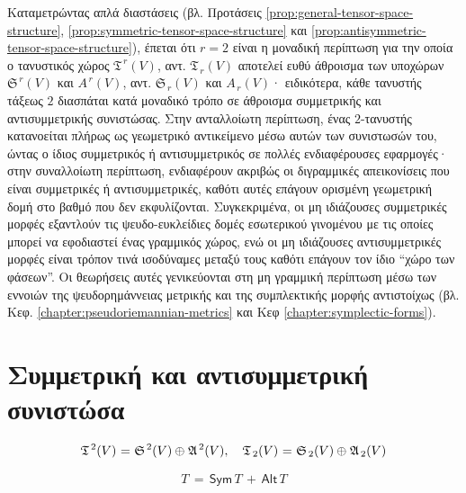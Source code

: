 \documentclass[11pt,a4paper,twoside,openright]{book}
\begin{document}
Καταμετρώντας απλά διαστάσεις (βλ. Προτάσεις \ref{prop:general-tensor-space-structure}, \ref{prop:symmetric-tensor-space-structure} και \ref{prop:antisymmetric-tensor-space-structure}), έπεται ότι $r=2$
είναι η μοναδική περίπτωση για την οποία ο τανυστικός χώρος
$\mathfrak{T}^{\,r}(V)$, αντ. $\mathfrak{T}_{\,r}(V)$ αποτελεί ευθύ άθροισμα των υποχώρων
$\mathfrak{S}^{\,r}(V)$ και $\mathfrak{Α}^{\,r}(V)$, αντ. $\mathfrak{S}_{\,r}(V)$ και $\mathfrak{Α}_{\,r}(V)$· ειδικότερα, κάθε τανυστής τάξεως $2$ διασπάται κατά μοναδικό τρόπο σε άθροισμα συμμετρικής και αντισυμμετρικής συνιστώσας. Στην ανταλλοίωτη περίπτωση, ένας $2$-τανυστής κατανοείται πλήρως ως γεωμετρικό αντικείμενο μέσω αυτών των συνιστωσών του, ώντας ο ίδιος συμμετρικός ή αντισυμμετρικός σε πολλές ενδιαφέρουσες εφαρμογές· στην συναλλοίωτη περίπτωση, ενδιαφέρουν ακριβώς οι διγραμμικές απεικονίσεις που είναι συμμετρικές ή αντισυμμετρικές, καθότι αυτές επάγουν ορισμένη γεωμετρική δομή στο βαθμό που δεν εκφυλίζονται. Συγκεκριμένα, οι μη ιδιάζουσες συμμετρικές μορφές εξαντλούν τις ψευδο-ευκλείδιες δομές εσωτερικού γινομένου με τις οποίες μπορεί να εφοδιαστεί ένας γραμμικός χώρος, ενώ οι μη ιδιάζουσες αντισυμμετρικές μορφές είναι τρόπον τινά ισοδύναμες μεταξύ τους
καθότι επάγουν τον ίδιο ``χώρο των φάσεων''.
Οι θεωρήσεις αυτές γενικεύονται στη μη γραμμική περίπτωση μέσω των εννοιών της ψευδορημάννειας μετρικής και της συμπλεκτικής μορφής
αντιστοίχως
(βλ. Κεφ. \ref{chapter:pseudoriemannian-metrics} και Κεφ \ref{chapter:symplectic-forms}).

	
\section{Συμμετρική και αντισυμμετρική συνιστώσα}

\begin{equation}
\mathfrak{T}^{\,2}(V)
\hspace{.5pt}=\hspace{.5pt}
\mathfrak{S}^{\,2}(V)
\oplus
\hspace{.5pt}
\mathfrak{A}^{\,2}(V),
\quad
\mathfrak{T}_{\,2}(V)
\hspace{.5pt}=\hspace{.5pt}
\mathfrak{S}_{\,2}(V)
\oplus
\hspace{.5pt}
\mathfrak{A}_{\,2}(V)
\end{equation}

\begin{equation}
T \,=\, \mathsf{Sym}\,T \,+\, \mathsf{Alt}\,T
\end{equation}
\end{document}
